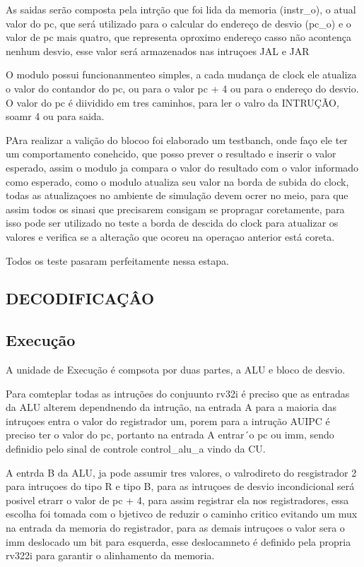 As saidas serão composta pela intrção que foi lida da memoria (instr_o), o atual valor do pc, que será utilizado para o calcular do endereço de desvio (pc_o) e o valor de pc mais quatro, que representa  oproximo endereço casso não acontença nenhum desvio, esse valor será armazenados nas intruçoes JAL e JAR

O modulo possui funcionanmenteo simples, a cada mudança de clock ele atualiza o valor do contandor do pc, ou para o valor pc + 4 ou para o endereço do desvio. O valor do pc é diividido em tres caminhos, para ler o valro da INTRUÇÃO, soamr 4 ou para saida.

PAra realizar a valição do blocoo foi elaborado um testbanch, onde faço ele ter um comportamento conehcido, que posso prever o resultado e inserir o valor esperado, assim o modulo ja compara o valor do resultado com o valor informado como esperado, como o modulo atualiza seu valor na borda de subida do clock, todas as atualizaçoes no ambiente de simulação devem ocrer no meio, para que assim todos os sinasi que precisarem consigam se propragar coretamente, para isso pode ser utilizado no teste a borda de descida do clock para atualizar os valores e verifica se a alteração que ocoreu na operaçao anterior está coreta.

Todos os teste pasaram perfeitamente nessa estapa.


\subsection{DECODIFICAÇÂO}
\label{sub:decodificar}


\subsection{Execução}
\label{sub:executar}

A unidade de Execução é compsota por duas partes, a ALU e bloco de desvio.

Para comteplar todas as intruções do conjuunto rv32i é preciso que as entradas da ALU alterem dependnendo da intrução, na entrada A para a maioria das intruçoes entra o valor do registrador um, porem para a intrução AUIPC é preciso ter o valor do pc, portanto na entrada A entrar´o pc ou imm, sendo definidio pelo sinal de controle control_alu_a vindo da CU.

A entrda B da ALU, ja pode assumir tres valores, o valrodireto do resgistrador 2 para intruçoes do tipo R e tipo B, para as intruçoes de desvio incondicional será posivel etrarr o valor de pc + 4, para assim registrar ela nos registradores, essa escolha foi tomada com o bjetivco de reduzir o caminho critico evitando um mux na entrada da memoria do registrador, para as demais intruçoes o valor sera o imm deslocado um bit para esquerda, esse deslocamneto é definido pela propria rv322i para garantir o alinhamento da memoria.

